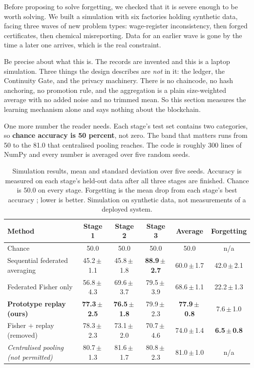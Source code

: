 \documentclass[11pt,a4paper]{article}
\begin{document}
Before proposing to solve forgetting, we checked that it is severe enough to be
worth solving. We built a simulation with six factories holding synthetic data,
facing three waves of new problem types: wage-register inconsistency, then
forged certificates, then chemical misreporting. Data for an earlier wave is
gone by the time a later one arrives, which is the real constraint.

Be precise about what this is. The records are invented and this is a laptop
simulation. Three things the design describes are \emph{not} in it: the ledger,
the Continuity Gate, and the privacy machinery. There is no chaincode, no hash
anchoring, no promotion rule, and the aggregation is a plain size-weighted
average with no added noise and no trimmed mean. So this section measures the
learning mechanism alone and says nothing about the blockchain.

One more number the reader needs. Each stage's test set contains two categories,
so \textbf{chance accuracy is 50 percent}, not zero. The band that matters runs
from 50 to the 81.0 that centralised pooling reaches. The code is roughly 300
lines of NumPy and every number is averaged over five random seeds.

\begin{table}[htbp]
\centering
\caption{Simulation results, mean and standard deviation over five seeds.
Accuracy is measured on each stage's held-out data after all three stages are
finished. Chance is 50.0 on every stage. Forgetting is the mean drop from each
stage's best accuracy \citep{chaudhry2018rwalk}; lower is better. Simulation on
synthetic data, not measurements of a deployed system.}
\label{tab:results}
\small
\setlength{\tabcolsep}{4.5pt}
\begin{tabular}{@{}l c c c c c@{}}
\toprule
\textbf{Method} & \textbf{Stage 1} & \textbf{Stage 2} & \textbf{Stage 3} &
\textbf{Average} & \textbf{Forgetting} \\
\midrule
Chance & 50.0 & 50.0 & 50.0 & 50.0 & n/a \\
Sequential federated averaging & 45.2\,$\pm$\,1.1 & 45.8\,$\pm$\,1.8 & \textbf{88.9\,$\pm$\,2.7} & 60.0\,$\pm$\,1.7 & 42.0\,$\pm$\,2.1 \\
Federated Fisher only          & 56.8\,$\pm$\,4.3 & 69.6\,$\pm$\,3.7 & 79.5\,$\pm$\,3.9 & 68.6\,$\pm$\,1.1 & 22.2\,$\pm$\,1.3 \\
\textbf{Prototype replay (ours)} & \textbf{77.3\,$\pm$\,2.5} & \textbf{76.5\,$\pm$\,1.8} & 79.9\,$\pm$\,2.3 & \textbf{77.9\,$\pm$\,0.8} & 7.6\,$\pm$\,1.0 \\
Fisher $+$ replay (removed)    & 78.3\,$\pm$\,2.3 & 73.1\,$\pm$\,2.0 & 70.7\,$\pm$\,4.6 & 74.0\,$\pm$\,1.4 & \textbf{6.5\,$\pm$\,0.8} \\
\midrule
\textit{Centralised pooling (not permitted)} & 80.7\,$\pm$\,1.3 & 81.6\,$\pm$\,1.7 & 80.8\,$\pm$\,2.3 & 81.0\,$\pm$\,1.0 & n/a \\
\bottomrule
\end{tabular}
\end{table}
\end{document}
